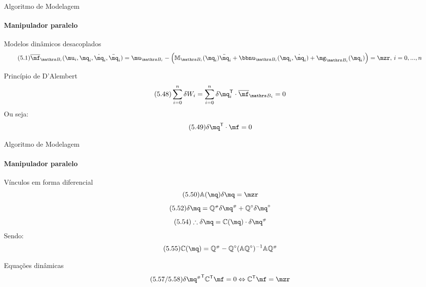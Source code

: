\documentclass[25pt,landscape]{beamer}
\begin{document}
\begin{frame}{Algoritmo de Modelagem}
    \framesubtitle{Manipulador paralelo}
    \begin{block}{Modelos dinâmicos desacoplados}
    	\begin{equation} \label{eq:ModeloDosSubsistemas} \tag{5.1}
			\overline{\mf}_{\ssB_i}(\mu_i, \mq_i, \dot{\mq}_i, \ddot{\mq}_i) =  \mu_{\ssB_i} - \Big(\mM_{\ssB_i}(\mq_i) \ddot{\mq}_i + \mnu_{\ssB_i}(\mq_i,\dot{\mq}_i) + \mg_{\ssB_i}(\mq_i)\Big) = \mzr, \, i = 0,...,n
		\end{equation}
    \end{block}
    \begin{block}{Princípio de D'Alembert}
    	\begin{equation} \tag{5.48}
			\sum_{i=0}^n \delta W_i = \sum_{i=0}^n \delta \mq_i^\msT \cdot \overline{\mf}_{\ssB_i} = 0
		\end{equation}
		Ou seja:
		\begin{equation} \label{eq:DAlambertParalelos} \tag{5.49}
			\delta \mq^\msT \cdot \mf = 0
		\end{equation}
    \end{block}
\end{frame}

\begin{frame}{Algoritmo de Modelagem}
    \framesubtitle{Manipulador paralelo}
    \begin{block}{Vínculos em forma diferencial}
    	\begin{equation} \label{eq:Adeltaq} \tag{5.50}
			\mA(\mq) \delta \mq = \mzr
		\end{equation}
		\begin{equation} \label{eq:deltaQsshQcir} \tag{5.52}
			\delta\mq = \mQ\ssh \delta\mq\ssh + \mQ\cir \delta\mq\cir
		\end{equation}
		\begin{equation} \label{eq:deltamqC} \tag{5.54}
			\therefore \delta \mq = \mC(\mq) \cdot \delta\mq\ssh
		\end{equation}
		Sendo:
		\begin{equation} \label{eq:CComplemento} \tag{5.55}
			\mC(\mq) = \mQ\ssh - \mQ\cir (\mA \mQ\cir)^{-1} \mA \mQ\ssh 
		\end{equation}
    \end{block}
    \begin{block}{Equações dinâmicas}
    	\begin{equation} \tag{5.57/5.58}
			\delta {\mq\ssh}^\msT \mC^\msT \mf = 0 \Leftrightarrow \mC^\msT \mf = \mzr
		\end{equation}
    \end{block}
\end{frame}
\end{document}
